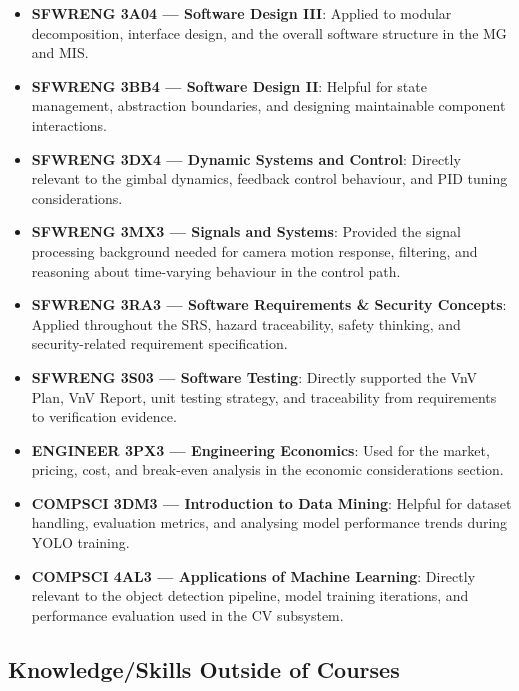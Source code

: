\documentclass{article}
\begin{document}
\begin{itemize}
  \item \textbf{SFWRENG 3A04 --- Software Design III}: Applied to modular
        decomposition, interface design, and the overall software structure in
        the MG and MIS.
  \item \textbf{SFWRENG 3BB4 --- Software Design II}: Helpful for state
        management, abstraction boundaries, and designing maintainable
        component interactions.
  \item \textbf{SFWRENG 3DX4 --- Dynamic Systems and Control}: Directly
        relevant to the gimbal dynamics, feedback control behaviour, and PID
        tuning considerations.
  \item \textbf{SFWRENG 3MX3 --- Signals and Systems}: Provided the signal
        processing background needed for camera motion response, filtering, and
        reasoning about time-varying behaviour in the control path.
  \item \textbf{SFWRENG 3RA3 --- Software Requirements \& Security Concepts}:
        Applied throughout the SRS, hazard traceability, safety thinking, and
        security-related requirement specification.
  \item \textbf{SFWRENG 3S03 --- Software Testing}: Directly supported the
        VnV Plan, VnV Report, unit testing strategy, and traceability from
        requirements to verification evidence.
  \item \textbf{ENGINEER 3PX3 --- Engineering Economics}: Used for the market,
        pricing, cost, and break-even analysis in the economic considerations
        section.
  \item \textbf{COMPSCI 3DM3 --- Introduction to Data Mining}: Helpful for
        dataset handling, evaluation metrics, and analysing model performance
        trends during YOLO training.
  \item \textbf{COMPSCI 4AL3 --- Applications of Machine Learning}: Directly
        relevant to the object detection pipeline, model training iterations,
        and performance evaluation used in the CV subsystem.
\end{itemize}

\subsection{Knowledge/Skills Outside of Courses}
\end{document}
